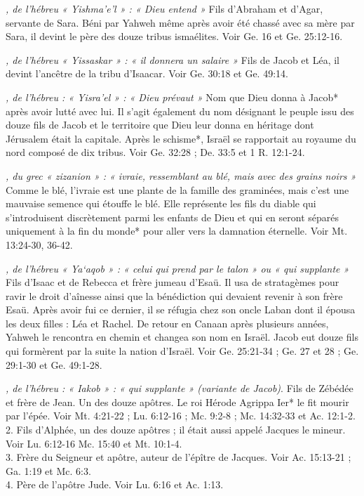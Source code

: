 \begin{multicols}{2}
{\textit{, de l'hébreu « Yishma'e'l » : « Dieu entend »}\newline
Fils d'Abraham et d'Agar, servante de Sara. Béni par Yahweh même après avoir été chassé avec sa mère par Sara, il devint le père des douze tribus ismaélites. Voir Ge. 16 et Ge. 25:12-16.

\textit{, de l'hébreu « Yissaskar » : « il donnera un salaire »}\newline
Fils de Jacob et Léa, il devint l'ancêtre de la tribu d'Isaacar. Voir Ge. 30:18 et Ge. 49:14.

\textit{, de l'hébreu : « Yisra'el » : « Dieu prévaut »}\newline
Nom que Dieu donna à Jacob* après avoir lutté avec lui. Il s'agit également du nom désignant le peuple issu des douze fils de Jacob et le territoire que Dieu leur donna en héritage dont Jérusalem était la capitale. Après le schisme*, Israël se rapportait au royaume du nord composé de dix tribus. Voir Ge. 32:28 ; De. 33:5 et 1 R. 12:1-24.

\textit{, du grec « zizanion » : « ivraie, ressemblant au blé, mais avec des grains noirs »}\newline
Comme le blé, l'ivraie est une plante de la famille des graminées, mais c'est une mauvaise semence qui étouffe le blé. Elle représente les fils du diable qui s'introduisent discrètement parmi les enfants de Dieu et qui en seront séparés uniquement à la fin du monde* pour aller vers la damnation éternelle. Voir Mt. 13:24-30, 36-42.

\textit{, de l'hébreu « Ya`aqob » : « celui qui prend par le talon » ou « qui supplante »}\newline
Fils d'Isaac et de Rebecca et frère jumeau d'Esaü. Il usa de stratagèmes pour ravir le droit d'aînesse ainsi que la bénédiction qui devaient revenir à son frère Esaü. Après avoir fui ce dernier, il se réfugia chez son oncle Laban dont il épousa les deux filles : Léa et Rachel. De retour en Canaan après plusieurs années, Yahweh le rencontra en chemin et changea son nom en Israël. Jacob eut douze fils qui formèrent par la suite la nation d'Israël. Voir Ge. 25:21-34 ; Ge. 27 et 28 ; Ge. 29:1-30 et Ge. 49:1-28.

\textit{, de l'hébreu : « Iakob » : « qui supplante » (variante de Jacob)}. Fils de Zébédée et frère de Jean. Un des douze apôtres. Le roi Hérode Agrippa Ier* le fit mourir par l'épée. Voir Mt. 4:21-22 ; Lu. 6:12-16 ; Mc. 9:2-8 ; Mc. 14:32-33 et Ac. 12:1-2.
\\2. Fils d'Alphée, un des douze apôtres ; il était aussi appelé Jacques le mineur. Voir Lu. 6:12-16 Mc. 15:40 et Mt. 10:1-4.
\\3. Frère du Seigneur et apôtre, auteur de l'épître de Jacques. Voir Ac. 15:13-21 ; Ga. 1:19 et Mc. 6:3.
\\4. Père de l'apôtre Jude. Voir Lu. 6:16 et Ac. 1:13.

}
\end{multicols}
